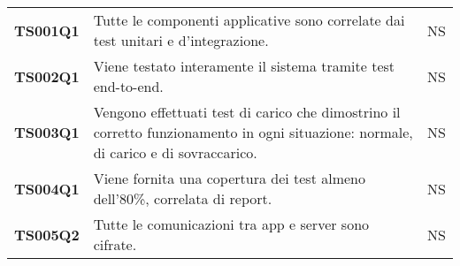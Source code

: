 \documentclass[../piano-di-qualifica.tex]{subfiles}
\begin{document}
\begin{centering}
\begin{longtable}[H]{>{\centering\bfseries}m{3cm} >{}p{10cm} >{\centering\arraybackslash}m{3cm}}
    TS001Q1            & Tutte le componenti applicative sono correlate dai test unitari e d’integrazione. \newline
                       & NS                                                                                                                                                                                                                                                               \\

    TS002Q1            & Viene testato interamente il sistema tramite test end-to-end. \newline
                       & NS                                                                                                                                                                                                                                                               \\

    TS003Q1            & Vengono effettuati test di carico che dimostrino il corretto funzionamento in ogni situazione: normale, di carico e di sovraccarico. \newline
                       & NS                                                                                                                                                                                                                                                               \\

    TS004Q1            & Viene fornita una copertura dei test almeno dell’80\%, correlata di report. \newline
                       & NS                                                                                                                                                                                                                                                               \\

    TS005Q2            & Tutte le comunicazioni tra app e server sono cifrate. \newline
                       & NS                                                                                                                                                                                                                                                               \\


\end{longtable}
\end{centering}
\end{document}
